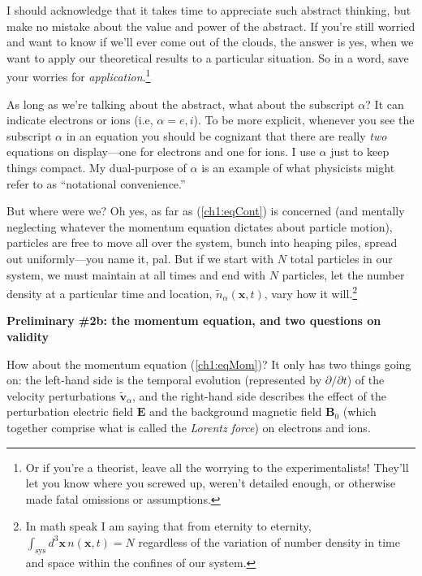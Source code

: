 I should acknowledge that it takes time to appreciate such abstract thinking,
but make no mistake about the value and power of the abstract. If you're still
worried and want to know if we'll ever come out of the clouds, the answer is
yes, when we want to apply our theoretical results to a particular situation. So
in a word, save your worries for \emph{application}.\footnote{Or if you're a
  theorist, leave all the worrying to the experimentalists! They'll let you know
  where you screwed up, weren't detailed enough, or otherwise made fatal
  omissions or assumptions.}

As long as we're talking about the abstract, what about the subscript $\alpha$?
It can indicate electrons or ions (i.e, $\alpha = e,i$). To be more explicit,
whenever you see the subscript $\alpha$ in an equation you should be cognizant
that there are really \emph{two} equations on display---one for electrons and
one for ions. I use $\alpha$ just to keep things compact. My dual-purpose of
$\alpha$ is an example of what physicists might refer to as ``notational
convenience.''

But where were we? Oh yes, as far as (\ref{ch1:eqCont}) is concerned (and
mentally neglecting whatever the momentum equation dictates about particle
motion), particles are free to move all over the system, bunch into heaping
piles, spread out uniformly---you name it, pal. But if we start with $N$ total
particles in our system, we must maintain at all times and end with $N$
particles, let the number density at a particular time and location,
$\tilde n_{\alpha}(\mathbf{x},t)$, vary how it will.\footnote{In math speak I am
  saying that from eternity to eternity,
  $\int_{\mathrm{sys}} d^3\mathbf{x} \, n(\mathbf{x},t) = N$ regardless of the
  variation of number density in time and space within the confines of our
  system.}

\textbf{Preliminary \#2b: the momentum equation, and two questions on validity}

How about the momentum equation (\ref{ch1:eqMom})? It only has two things going
on: the left-hand side is the temporal evolution (represented by $\partial
/ \partial t$) of the velocity perturbations $\mathbf{\tilde v}_\alpha$, and the
right-hand side describes the effect of the perturbation electric field
$\mathbf{E}$ and the background magnetic field $\mathbf{B}_0$ (which
together comprise what is called the \emph{Lorentz force}) on electrons and
ions.

